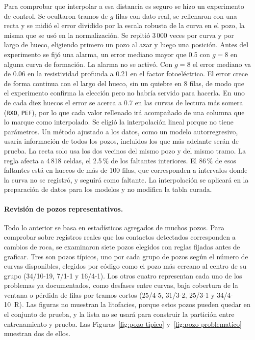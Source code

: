 \documentclass[11pt,a4paper]{article}
\begin{document}
Para comprobar que interpolar a esa distancia es seguro se hizo un experimento de control. Se ocultaron tramos de $g$ filas con dato real, se rellenaron con una recta y se midió el error dividido por la escala robusta de la curva en el pozo, la misma que se usó en la normalización. Se repitió 3\,000 veces por curva y por largo de hueco, eligiendo primero un pozo al azar y luego una posición. Antes del experimento se fijó una alarma, un error mediano mayor que 0.5 con $g = 8$ en alguna curva de formación. La alarma no se activó. Con $g = 8$ el error mediano va de 0.06 en la resistividad profunda a 0.21 en el factor fotoeléctrico. El error crece de forma continua con el largo del hueco, sin un quiebre en 8 filas, de modo que el experimento confirma la elección pero no habría servido para hacerla. En uno de cada diez huecos el error se acerca a 0.7 en las curvas de lectura más somera (\texttt{RXO}, \texttt{PEF}), por lo que cada valor rellenado irá acompañado de una columna que lo marque como interpolado. Se eligió la interpolación lineal porque no tiene parámetros. Un método ajustado a los datos, como un modelo autorregresivo, usaría información de todos los pozos, incluidos los que más adelante serán de prueba. La recta solo usa los dos vecinos del mismo pozo y del mismo tramo. La regla afecta a 4\,818 celdas, el 2.5\,\% de los faltantes interiores. El 86\,\% de esos faltantes está en huecos de más de 100 filas, que corresponden a intervalos donde la curva no se registró, y seguirá como faltante. La interpolación se aplicará en la preparación de datos para los modelos y no modifica la tabla curada.

\paragraph{Revisión de pozos representativos.} Todo lo anterior se basa en estadísticos agregados de muchos pozos. Para comprobar sobre registros reales que los contactos detectados corresponden a cambios de roca, se examinaron siete pozos elegidos con reglas fijadas antes de graficar. Tres son pozos típicos, uno por cada grupo de pozos según el número de curvas disponibles, elegidos por código como el pozo más cercano al centro de su grupo (34/10-19, 7/1-1 y 16/4-1). Los otros cuatro representan cada uno de los problemas ya documentados, como desfases entre curvas, baja cobertura de la ventana o pérdida de filas por tramos cortos (25/4-5, 31/3-2, 25/3-1 y 34/4-10~R). Las figuras no muestran la litofacies, porque estos pozos pueden quedar en el conjunto de prueba, y la lista no se usará para construir la partición entre entrenamiento y prueba. Las Figuras~\ref{fig:pozo-tipico} y~\ref{fig:pozo-problematico} muestran dos de ellos.
\end{document}
